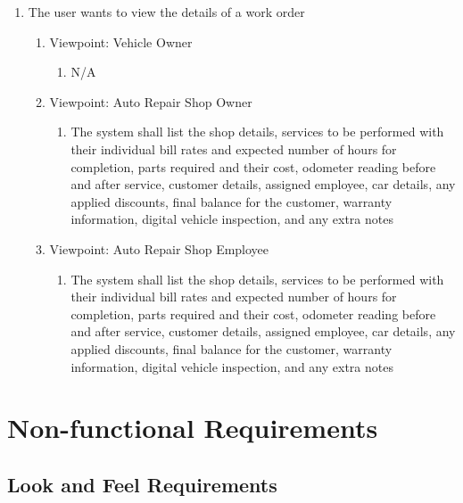 \documentclass[12pt]{article}
\begin{document}
\begin{enumerate}[resume*=business_events]
	\item The user wants to view the details of a work order
	      \begin{enumerate}[VP\arabic*.]
		      \item Viewpoint: Vehicle Owner
		            \begin{enumerate}
			            \item[] N/A
		            \end{enumerate}
		      \item Viewpoint: Auto Repair Shop Owner
		            \begin{enumerate}
			            \item The system shall list the shop details, services to be performed with their individual bill rates
			                  and expected number of hours for completion, parts required and their cost, odometer reading before
			                  and after service, customer details, assigned employee, car details, any applied discounts, final
			                  balance for the customer, warranty information, digital vehicle inspection, and any extra notes
		            \end{enumerate}
		      \item Viewpoint: Auto Repair Shop Employee
		            \begin{enumerate}
			            \item The system shall list the shop details, services to be performed with their individual bill rates
			                  and expected number of hours for completion, parts required and their cost, odometer reading before
			                  and after service, customer details, assigned employee, car details, any applied discounts, final
			                  balance for the customer, warranty information, digital vehicle inspection, and any extra notes
		            \end{enumerate}
	      \end{enumerate}

\end{enumerate}

\section{Non-functional Requirements}

\subsection{Look and Feel Requirements}
\end{document}
